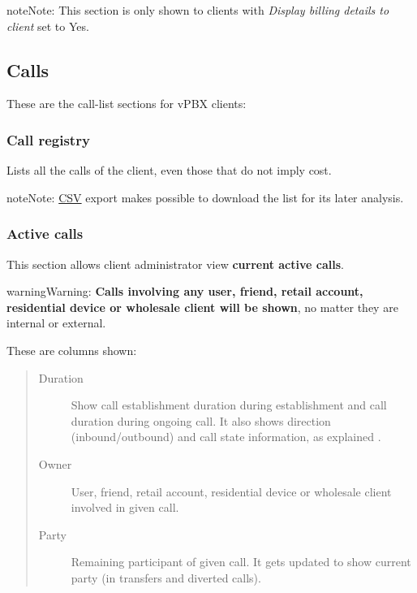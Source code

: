\documentclass[letterpaper,10pt,english]{sphinxmanual}
\begin{document}
\begin{notice}{note}{Note:}
This section is only shown to clients with \emph{Display billing details to client} set to Yes.
\end{notice}


\subsection{Calls}
\label{administration_portal/client/vpbx/calls/index::doc}\label{administration_portal/client/vpbx/calls/index:calls}
These are the call-list sections for vPBX clients:


\subsubsection{Call registry}
\label{administration_portal/client/vpbx/calls/call_registry::doc}\label{administration_portal/client/vpbx/calls/call_registry:call-registry}\label{administration_portal/client/vpbx/calls/call_registry:id1}
Lists all the calls of the client, even those that do not imply cost.

\begin{notice}{note}{Note:}
\href{https://es.wikipedia.org/wiki/CSV}{CSV} export makes possible to
download the list for its later analysis.
\end{notice}


\subsubsection{Active calls}
\label{administration_portal/client/vpbx/calls/active_calls::doc}\label{administration_portal/client/vpbx/calls/active_calls:active-calls}
This section allows client administrator view \textbf{current active calls}.

\begin{notice}{warning}{Warning:}
\textbf{Calls involving any user, friend, retail account, residential device or wholesale client will be shown},
no matter they are internal or external.
\end{notice}

These are columns shown:
\begin{quote}
\begin{description}
\item[{Duration}] \leavevmode
Show call establishment duration during establishment and call duration during ongoing call. It also shows
direction (inbound/outbound) and call state information, as explained {\hyperref[administration_portal/platform/active_calls:call\string-state]{}}.

\item[{Owner}] \leavevmode
User, friend, retail account, residential device or wholesale client involved in given call.

\item[{Party}] \leavevmode
Remaining participant of given call. It gets updated to show current party (in transfers and diverted calls).

\end{description}
\end{quote}
\end{document}
